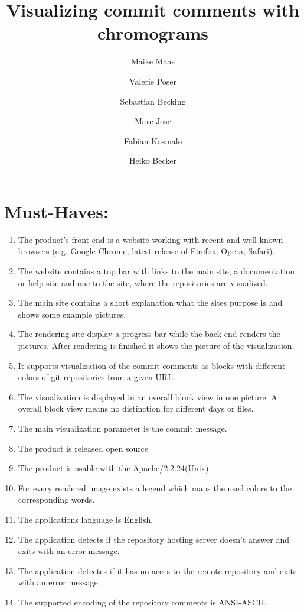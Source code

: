 \documentclass[12pt]{scrartcl}
\author{Maike Maas \and Valerie Poser \and Sebastian Becking
\and Marc Jose \and Fabian Kosmale  \and Heiko Becker}
\title{Visualizing commit comments with chromograms}
\begin{document}
\maketitle
\section{Must-Haves:}
\begin{enumerate}
\item The product's front end is a website working with recent and well known browsers (e.g. Google Chrome, latest release of Firefox, Opera, Safari). 
\item The website contains a top bar with links to the main site, a documentation or help site and one to the site, where the repositories are visualized. 
\item The main site contains a short explanation what the sites purpose is and shows some example pictures. 
\item The rendering site display a progress bar while the back-end renders the pictures. After rendering is finished it shows the picture of the visualization.
\item It supports visualization of the commit comments as blocks with different colors of git repositories from a given URL. 
\item The visualization is displayed in an overall block view in one picture. A overall block view means no distinction for different days or files.
\item The main visualization parameter is the commit message.
\item The product is released open source 
\item The product is usable with the Apache/2.2.24(Unix).
\item For every rendered image exists a legend which maps the used colors to the corresponding words.
\item The applications language is English.
\item The application detects if the repository hosting server doesn't answer and exits with an error message.
\item The application detectes if it has no acces to the remote repository and exits with an error message.
\item The supported encoding of the repository comments is ANSI-ASCII.
\end{enumerate}
\end{document}
